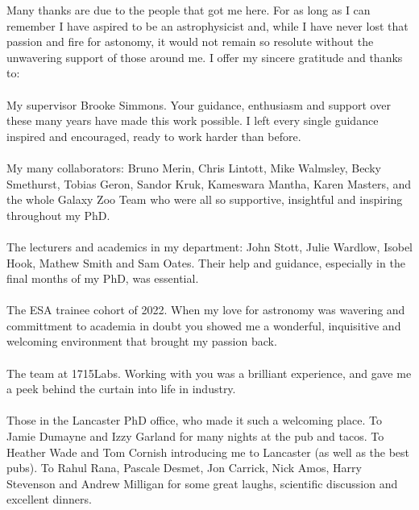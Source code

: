 

\begin{acknowledgements}      %
Many thanks are due to the people that got me here. For as long as I can remember I have aspired to be an astrophysicist and, while I have never lost that passion and fire for astonomy, it would not remain so resolute without the unwavering support of those around me. I offer my sincere gratitude and thanks to:
\\
\\
My supervisor Brooke Simmons. Your guidance, enthusiasm and support over these many years have made this work possible. I left every single guidance inspired and encouraged, ready to work harder than before.
\\
\\
My many collaborators: Bruno Merin, Chris Lintott, Mike Walmsley, Becky Smethurst, Tobias Geron, Sandor Kruk, Kameswara Mantha, Karen Masters, and the whole Galaxy Zoo Team who were all so supportive, insightful and inspiring throughout my PhD. 
\\
\\
The lecturers and academics in my department: John Stott, Julie Wardlow, Isobel Hook, Mathew Smith and Sam Oates. Their help and guidance, especially in the final months of my PhD, was essential.
\\
\\
The ESA trainee cohort of 2022. When my love for astronomy was wavering and committment to academia in doubt you showed me a wonderful, inquisitive and welcoming environment that brought my passion back.
\\
\\
The team at 1715Labs. Working with you was a brilliant experience, and gave me a peek behind the curtain into life in industry.
\\
\\
Those in the Lancaster PhD office, who made it such a welcoming place. To Jamie Dumayne and Izzy Garland for many nights at the pub and tacos. To Heather Wade and Tom Cornish introducing me to Lancaster (as well as the best pubs). To Rahul Rana, Pascale Desmet, Jon Carrick, Nick Amos, Harry Stevenson and Andrew Milligan for some great laughs, scientific discussion and excellent dinners.

\end{acknowledgements}
